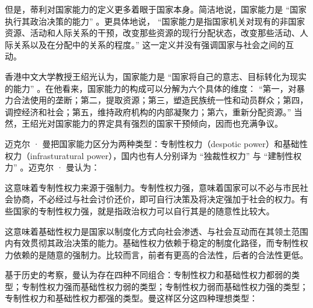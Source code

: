 但是，蒂利对国家能力的定义更多着眼于国家本身。简洁地说，国家能力是 “国家执行其政治决策的能力” 。更具体地说， “国家能力是指国家机关对现有的非国家资源、活动和人际关系的干预，改变那些资源的现行分配状态，改变那些活动、人际关系以及在分配中的关系的程度。” 这一定义并没有强调国家与社会之间的互动。

香港中文大学教授王绍光认为，国家能力是 “国家将自己的意志、目标转化为现实的能力” 。在他看来，国家能力的构成可以分解为六个具体的维度： “第一，对暴力合法使用的垄断；第二，提取资源；第三，塑造民族统一性和动员群众；第四，调控经济和社会；第五，维持政府机构的内部凝聚力；第六，重新分配资源。” 当然，王绍光对国家能力的界定具有强烈的国家干预倾向，因而也充满争议。


迈克尔 · 曼把国家能力区分为两种类型：专制性权力（despotic power）和基础性权力（infrasturatural power），国内也有人分别译为 “独裁性权力” 与 “建制性权力” 。迈克尔 · 曼认为：


这意味着专制性权力来源于强制力。专制性权力强，意味着国家可以不必与市民社会协商，不必经过与社会讨价还价，即可自行决策及将决定强加于社会的权力。有些国家的专制性权力强，就是指政治权力可以自行其是的随意性比较大。


这意味着基础性权力是国家以制度化方式向社会渗透、与社会互动而在其领土范围内有效贯彻其政治决策的能力。基础性权力依赖于稳定的制度化路径，而专制性权力依赖的是随意的强制力。比较而言，前者有更高的合法性，后者的合法性更低。

基于历史的考察，曼认为存在四种不同组合：专制性权力和基础性权力都弱的类型；专制性权力强而基础性权力弱的类型；专制性权力弱而基础性权力强的类型；专制性权力和基础性权力都强的类型。曼这样区分这四种理想类型：


